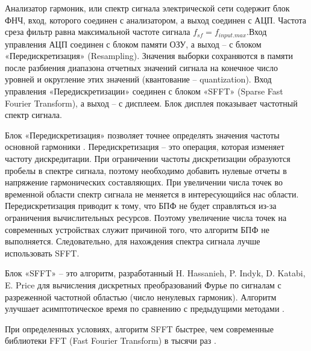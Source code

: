 Анализатор гармоник, или спектр сигнала электрической сети содержит блок ФНЧ, вход, которого соединен с анализатором, а выход соединен с АЦП. Частота среза фильтр равна максимальной частоте сигнала $f_{sf} = f_{input.max} $.Вход управления АЦП соединен с блоком памяти ОЗУ, а выход – с блоком «Передискретизация» (Resampling). Значения выборки сохраняются в памяти после разбиения диапазона отчетных значений сигнала на конечное число уровней и округление этих значений (квантование – quantization). Вход управления «Передискретизации» соединен с блоком «SFFT» (Sparse Fast
Fourier Transform), а выход – с дисплеем. Блок дисплея показывает частотный спектр сигнала.

Блок «Передискретизация» позволяет точнее определять значения 
частоты основной гармоники \cite{Thomasi2017electronic}. 
Передискретизация – это операция, которая изменяет частоту дискредитации. При ограничении частоты 
дискретизации образуются пробелы в спектре сигнала, поэтому необходимо добавить нулевые отчеты в напряжение гармонических составляющих. При увеличении числа точек во временной области спектр сигнала не меняется в интересующийся нас области. Передискретизация приводит к тому, что БПФ не будет справляться из-за ограничения вычислительных ресурсов. Поэтому увеличение числа точек 
на современных устройствах служит причиной того, что алгоритм БПФ не выполняется. Следовательно, для нахождения спектра сигнала лучше использовать SFFT.

Блок «SFFT» – это алгоритм, разработанный H. Hassanieh, P. Indyk, D. Katabi, E. Price для вычисления дискретных преобразований Фурье по сигналам с разреженной частотной областью (число ненулевых гармоник). Алгоритм улучшает асимптотическое время по сравнению с предыдущими методами \cite{hassanieh2012nearly, gilbert2002near}. 


При определенных условиях, алгоритм SFFT быстрее, чем современные библиотеки FFT (Fast Fourier Transform) в тысячи раз \cite {6986055, spiral}. 


